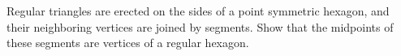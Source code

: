 Regular triangles are erected on the sides of a point symmetric hexagon, and their neighboring vertices are joined by segments. Show that the midpoints of these segments are vertices of a regular hexagon.
